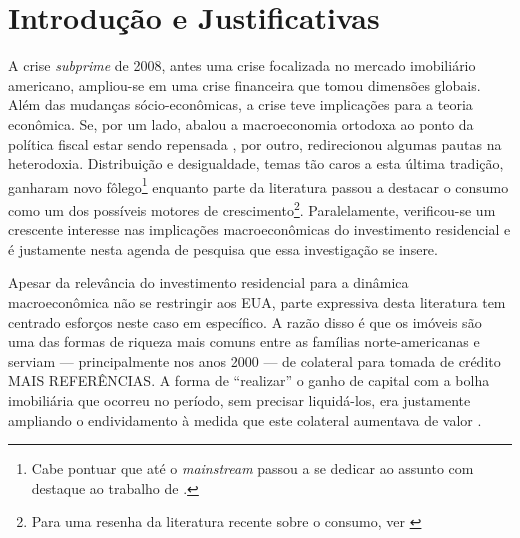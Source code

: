 \section{Introdução e Justificativas}\label{Intro}





A crise \textit{subprime} de 2008, antes uma crise focalizada no mercado imobiliário americano, ampliou-se em uma crise financeira que tomou dimensões globais. Além das mudanças sócio-econômicas, a crise teve implicações para a teoria econômica. Se, por um lado, abalou a macroeconomia ortodoxa ao ponto da política fiscal estar sendo repensada \cite{blanchard_rethinking_2017}, por outro, redirecionou algumas pautas na heterodoxia. Distribuição e desigualdade, temas tão caros a esta última tradição, ganharam novo fôlego\footnote{Cabe pontuar que até o \textit{mainstream} passou a se dedicar ao assunto com destaque ao trabalho de \textcite{piketty_o_2014}.} \cites{carvalho_personal_2016}{ederer_will_2019} enquanto parte da literatura passou a destacar o consumo como um dos possíveis motores de crescimento\footnote{Para uma resenha da literatura recente sobre o consumo, ver \textcite{brochier_macroeconomics_2017}}. Paralelamente, verificou-se um crescente interesse nas implicações macroeconômicas do investimento residencial \cites{teixeira_crescimento_2015}{fiebiger_semi-autonomous_2018} e é justamente nesta agenda de pesquisa que essa investigação se insere. 

Apesar da relevância do investimento residencial para a dinâmica macroeconômica não se restringir aos EUA, parte expressiva desta literatura tem centrado esforços neste caso em específico. A razão disso é que os imóveis são  uma das formas de riqueza mais comuns entre as famílias norte-americanas e serviam --- principalmente nos anos 2000 --- de colateral para tomada de crédito \cite{teixeira_uma_2011} MAIS REFERÊNCIAS. A forma de ``realizar'' o ganho de capital com a bolha imobiliária que ocorreu no período, sem precisar liquidá-los, era justamente ampliando o endividamento à medida que este colateral aumentava de valor \cite{teixeira_crescimento_2015}. 

